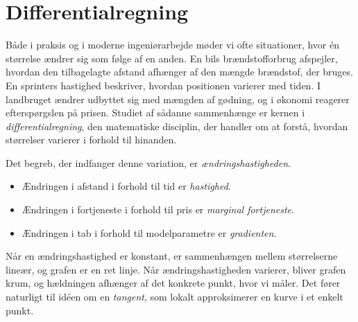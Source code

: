 \chapter{Differentialregning}
\label{chap:ch10}

Både i praksis og i moderne ingeniørarbejde møder vi ofte situationer, hvor én størrelse ændrer sig som følge af en anden. En bils brændstofforbrug afspejler, hvordan den tilbagelagte afstand afhænger af den mængde brændstof, der bruges. En sprinters hastighed beskriver, hvordan positionen varierer med tiden. I landbruget ændrer udbyttet sig med mængden af gødning, og i økonomi reagerer efterspørgslen på prisen. Studiet af sådanne sammenhænge er kernen i \emph{differentialregning}, den matematiske disciplin, der handler om at forstå, hvordan størrelser varierer i forhold til hinanden.

Det begreb, der indfanger denne variation, er \emph{ændringshastigheden}.

\begin{itemize}
\item Ændringen i afstand i forhold til tid er \emph{hastighed}.
\item Ændringen i fortjeneste i forhold til pris er \emph{marginal fortjeneste}.
\item Ændringen i tab i forhold til modelparametre er \emph{gradienten}.
\end{itemize}

Når en ændringshastighed er konstant, er sammenhængen mellem størrelserne lineær, og grafen er en ret linje. Når ændringshastigheden varierer, bliver grafen krum, og hældningen afhænger af det konkrete punkt, hvor vi måler. Det fører naturligt til idéen om en \emph{tangent}, som lokalt approksimerer en kurve i et enkelt punkt.




